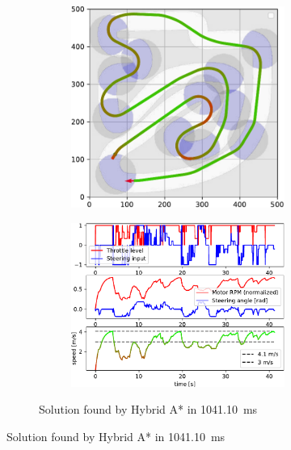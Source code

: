 \begin{figure}[!tbp]%
	\centering
	
	\begin{subfigure}[t]{\textwidth}
		\begin{subfigure}[c]{0.49\textwidth}
			\includegraphics[width=\textwidth]{../img/experiments/zurich_hybrid_astar_trajectory.pdf}
		\end{subfigure}
		\hfill
		\begin{subfigure}[c]{0.49\textwidth}
			\includegraphics[width=\textwidth]{../img/experiments/zurich_hybrid_astar_actuators}
		\end{subfigure}
		\caption{Solution found by Hybrid A* in \SI{1041.10}{\milli\second}}
		\label{fig:zurich-hybrid_astar}
	\end{subfigure}
	

\end{figure}
